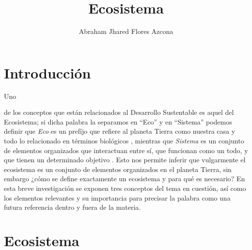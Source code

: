 \documentclass[stu, 12pt, letterpaper, donotrepeattitle, floatsintext, natbib]{apa7}
\title{\Large Ecosistema}
\author{Abraham Jhared Flores Azcona} %
\affiliation{Instituto Tecnológico de Tijuana}
\begin{document}
\maketitle


\renewcommand\contentsname{Contenido}
\tableofcontents

\newpage
\section*{Introducción}
Uno \begin{justifying}
    de los conceptos que están relacionados al Desarrollo Sustentable es aquel del Ecosistema; si dicha palabra la separamos en ``Eco'' y en ``Sistema'' podemos definir que 
    \emph{Eco} es un prefíjo que refiere al planeta Tierra como nuestra casa y todo lo relacionado en términos biológicos \citep{unknown-author-no-date},
     mientras que \emph{Sistema} es un conjunto de elementos organizados que interactuan entre sí, que funcionan como un todo, y que tienen un determinado objetivo \citep{alburquerque-2018}. 
     Esto nos permite inferir que vulgarmente el ecosistema es un conjunto de elementos organizados en el planeta Tierra, sin embargo ¿cómo se define exactamente un ecosistema y para qué es necesario? En esta
     breve investigación se exponen tres conceptos del tema en cuestión, así como los elementos relevantes y su importancia para precisar la palabra como una futura referencia dentro y fuera de la materia.\par
\end{justifying}
\vspace{\baselineskip}
\section{Ecosistema}
\end{document}
